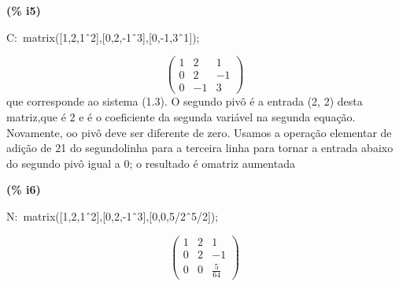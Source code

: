 \documentclass[fleqn]{article}
\begin{document}
\noindent
\begin{minipage}[t]{4.000000em}\color{red}\bfseries
(\% i5)	
\end{minipage}
\begin{minipage}[t]{\textwidth}\color{blue}
C:\ matrix([1,2,1\^\ 2],[0,2,-1\^\ 3],[0,-1,3\^\ 1]);
\end{minipage}
\[\displaystyle \tag{C} 
\begin{pmatrix}1 & 2 & 1\\
0 & 2 & \mathop{-}1\\
0 & \mathop{-}1 & 3\end{pmatrix}\mbox{}
\]
que corresponde ao sistema (1.3). O segundo pivô é a entrada (2, 2) desta matriz,que é 2 e é o coeficiente da segunda variável na segunda equação. Novamente, oo pivô deve ser diferente de zero. Usamos a operação elementar de adição de 21 do segundolinha para a terceira linha para tornar a entrada abaixo do segundo pivô igual a 0; o resultado é omatriz aumentada


\noindent
\begin{minipage}[t]{4.000000em}\color{red}\bfseries
(\% i6)	
\end{minipage}
\begin{minipage}[t]{\textwidth}\color{blue}
N:\ matrix([1,2,1\^\ 2],[0,2,-1\^\ 3],[0,0,5/2\^\ 5/2]);
\end{minipage}
\[\displaystyle \tag{N} 
\begin{pmatrix}1 & 2 & 1\\
0 & 2 & \mathop{-}1\\
0 & 0 & \frac{5}{64}\end{pmatrix}\mbox{}
\]
\end{document}
